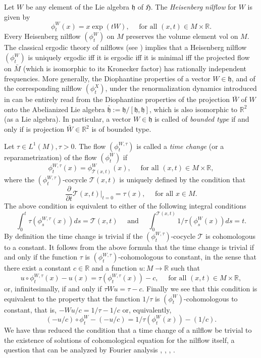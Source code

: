 \documentclass[10pt]{amsart}
\let\mathcal\mathscr
\newcommand{\vol}{\mathrm{vol}}
\theoremstyle{definition}
\theoremstyle{plain}
\newcommand\RR{\mathbb{R}}
\begin{document}
Let $W$ be any element of the Lie algebra $\mathfrak h$ of $\mathfrak H$. The \emph{Heisenberg nilflow} for $W$ is given by
\[
\phi^W_t(x)=x\exp(tW), \quad \text{ for all } (x,t)\in M\times \RR.
\]
Every Heisenberg nilflow $(\phi^W_t)$ on $M$ preserves the volume element $\vol$ on $M$.
The classical ergodic theory of nilflows (see \cite{AGH}) implies that a Heisenberg nilflow $(\phi^W_t)$ is uniquely ergodic iff it is ergodic iff it is minimal iff the
projected flow on $\bar M$ (which is isomorphic to its Kronecker factor) has rationally independent frequencies.
More generally, the Diophantine properties of a vector $W\in \mathfrak h$, and of the corresponding nilflow $(\phi^X_t)$, under the renormalization dynamics
introduced in \cite{FlaFo1} can be entirely read from the Diophantine properties of the projection $\bar W$ of $W$ onto the Abelianized Lie algebra
$\bar {\mathfrak h} := \mathfrak h/[\mathfrak h,\mathfrak h]$, which is also isomorphic to $\RR^2$ (as a Lie algebra). In particular, a vector $W\in \mathfrak h$ is
called of \emph{bounded type} if and only if is projection $\bar W \in \RR^2$ is of bounded type.

Let $\tau\in L^1(M), \tau>0$. The flow $(\phi_t^{W,\tau})$ is called a \emph{time change} (or a reparametrization) of the flow $(\phi_t^W)$ if
\[
\phi_t^{W,\tau}(x)=\phi^W_{\mathcal T(x,t)}(x), \quad \text{ for all } (x,t) \in M\times \RR,
\]
where the $(\phi^{W, \tau}_t)$-cocycle $\mathcal T(x,t)$ is uniquely defined by the condition that
\[
\frac{\partial}{\partial t} {\mathcal T}(x, t) \vert _{t=0} = \tau (x), \quad \text{ for all } x\in M.
\]
The above condition is equivalent to either of the following integral conditions
\[
\int_{0}^{t} \tau(\phi_s^{W, \tau}(x))ds= \mathcal T (x,t)\quad \text{ and } \quad \int_{0}^{\mathcal T (x,t)} 1/\tau(\phi_s^W(x))ds=t.
\]
By definition the time change is trivial if the $(\phi^{W,\tau}_t)$-cocycle $\mathcal T$ is cohomologous to a constant. It follows from the above formula that the time change is trivial if and only if the function $\tau$
is $(\phi^{W, \tau}_t)$-cohomologous to constant, in the sense that there exist a constant
$c\in \RR$ and a function $u:M\to \RR$ such that
\[
u \circ \phi^{W, \tau} _t(x) - u(x) = \tau(\phi_t^{W,\tau}(x)) -c, \quad \text{ for all } (x,t)\in M\times \RR,
\]
or, infinitesimally, if and only if $ \tau W u = \tau - c$. Finally we see that this condition is equivalent to
the property that the function $1/\tau$ is $(\phi^{W}_t)$-cohomologous to constant, that is, $ -W u/c=1/\tau-1/c$
or, equivalently,
\[
(-u/c) \circ \phi^W _t - (-u/c) = 1/\tau(\phi_t^{W}(x)) - (1/c).
\]
We have thus reduced the condition that a time change of a nilflow be trivial to the existence of solutions of cohomological equation for the nilflow itself, a question that can be analyzed by Fourier analysis \cite{Katok:CC},
\cite{FlaFo1}, \cite{AFU}, \cite{FoSurvey}.
\end{document}
